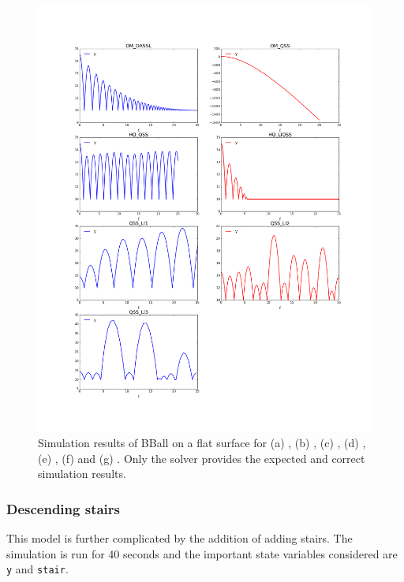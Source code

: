 \documentclass[10pt]{article}
\begin{document}
        \begin{figure}[htbp]
\begin{center}
\includegraphics[scale=0.42, clip,trim={40mm 40mm 30mm 40mm}]{./Figures/Model6.png}
\end{center}
\vspace{-0.5cm}
\caption{Simulation results of BBall on a flat surface for (a) {}, (b) {}, (c) {}, (d) {},  (e) {},  (f) {} and (g) {}. Only the {} solver provides the expected and correct simulation results.}\label{Fig41}
\end{figure}

\newpage

\subsubsection{Descending stairs}

This model is further complicated by the addition of adding stairs. The simulation is run for 40 seconds and the important state variables considered are {\tt{y}} and {\tt{stair}}.
\end{document}
